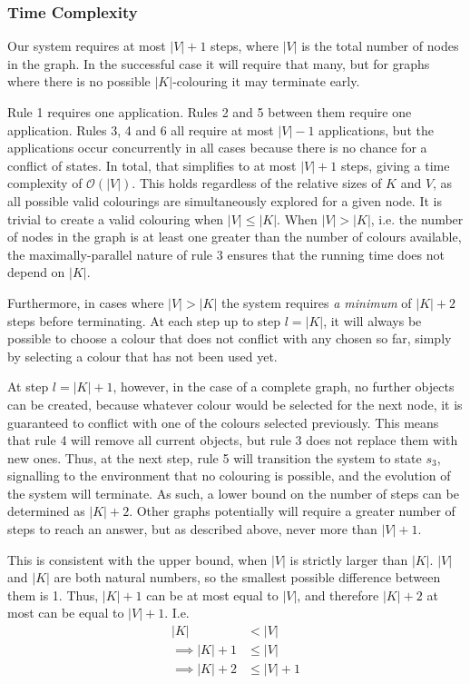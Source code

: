 \subsubsection{Time Complexity}
Our system requires at most \(|V| + 1\) steps, where \(|V|\) is the total number of nodes in the graph.  In the successful case it will require that many, but for graphs where there is no possible \(|K|\)-colouring it may terminate early.

Rule 1 requires one application.  Rules 2 and 5 between them require one application.  Rules 3, 4 and 6 all require at most \(|V|-1\) applications, but the applications occur concurrently in all cases because there is no chance for a conflict of states.  In total, that simplifies to at most \(|V| + 1\) steps, giving a time complexity of \(\mathcal{O}(|V|)\).  This holds regardless of the relative sizes of \(K\) and \(V\), as all possible valid colourings are simultaneously explored for a given node.  It is trivial to create a valid colouring when \(|V| \leq |K|\).   When \(|V| > |K|\), i.e. the number of nodes in the graph is at least one greater than the number of colours available, the maximally-parallel nature of rule 3 ensures that the running time does not depend on \(|K|\).

Furthermore, in cases where \(|V| > |K|\) the system requires \emph{a minimum} of \(|K| + 2\) steps before terminating.  At each step up to step \(l = |K|\), it will always be possible to choose a colour that does not conflict with any chosen so far, simply by selecting a colour that has not been used yet.  

At step \(l = |K| + 1\), however, in the case of a complete graph, no further \bo{} objects can be created, because whatever colour would be selected for the next node, it is guaranteed to conflict with one of the colours selected previously.  This means that rule 4 will remove all current \bo{} objects, but rule 3 does not replace them with new ones.  Thus, at the next step, rule 5 will transition the system to state \(s_3\), signalling to the environment that no colouring is possible, and the evolution of the system will terminate.  As such, a lower bound on the number of steps can be determined as \(|K| + 2\).  Other graphs potentially will require a greater number of steps to reach an answer, but as described above, never more than \(|V| + 1\).

This is consistent with the upper bound, when \(|V|\) is strictly larger than \(|K|\).  \(|V|\) and \(|K|\) are both natural numbers, so the smallest possible difference between them is 1.  Thus, \(|K| + 1\) can be at most equal to \(|V|\), and therefore \(|K| + 2\) at most can be equal to \(|V| + 1\).  I.e.
\begin{align*}
    |K| &< |V|\\
    \implies |K| + 1 &\leq |V|\\
    \implies |K| + 2 &\leq |V| + 1
\end{align*}

